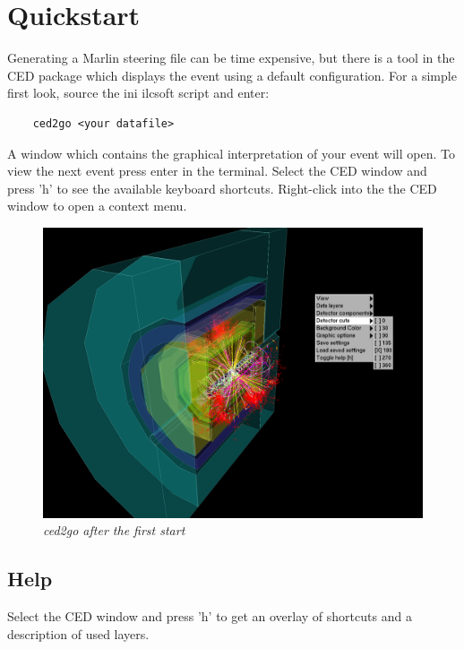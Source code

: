 \documentclass[a4paper,10pt]{article}
\begin{document}
\section{Quickstart}
Generating a Marlin steering file can be time expensive, but there is a tool in the CED package which displays the event using a default configuration. For a simple first look, source the ini ilcsoft script and enter: 
\begin{verbatim}
    ced2go <your datafile>
\end{verbatim}
A window which contains the graphical interpretation of your event will open. To view the next event press enter in the terminal.
\newline\newline
Select the CED window and press 'h' to see the available keyboard shortcuts. Right-click into the the CED window to open a context menu.

\begin{figure}[h]
\centerline{ \includegraphics[width=1\linewidth]{quickstart6.png}}
\caption{\label{CEDViewer} \textsl{ced2go after the first start}}
\end{figure}


\subsection{Help}
Select the CED window and press 'h' to get an overlay of shortcuts and a description of used layers.
\end{document}
